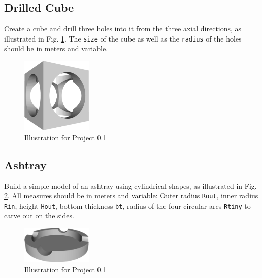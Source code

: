 \subsection{Drilled Cube} \label{4.2}
Create a cube and drill three holes into it from the three axial 
directions, as illustrated in Fig. \ref{fig:drilledcube}.
The {\tt size} of the cube as well as the {\tt radius} of the 
holes should be in meters and variable. 

\begin{figure}[!ht]
\begin{center}
\includegraphics[width=0.3\textwidth]{img/drilledcube.png}
\end{center}
\vspace{-2mm}
\caption{Illustration for Project \ref{4.2}}
\label{fig:drilledcube}
\end{figure}


\subsection{Ashtray} \label{4.3}
Build a simple model of an ashtray using cylindrical shapes, 
as illustrated in Fig. \ref{fig:ashtray}. All measures should be 
in meters and variable: Outer radius {\tt Rout}, inner radius {\tt Rin},
height {\tt Hout}, bottom thickness {\tt bt}, radius of the four 
circular arcs {\tt Rtiny} to carve out on the sides.

\begin{figure}[!ht]
\begin{center}
\includegraphics[width=0.3\textwidth]{img/ashtray.png}
\end{center}
\vspace{-2mm}
\caption{Illustration for Project \ref{4.2}}
\label{fig:ashtray}
\end{figure}
\noindent



